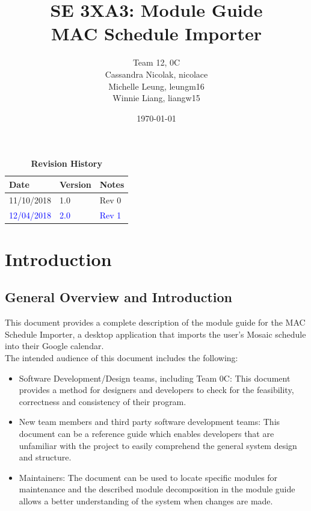 \documentclass[12pt, titlepage]{article}
\title{SE 3XA3: Module Guide\\MAC Schedule Importer}
\author{Team 12, 0C
		\\ Cassandra Nicolak, nicolace
		\\ Michelle Leung, leungm16
		\\ Winnie Liang, liangw15
}
\date{\today}
\begin{document}
\maketitle

\tableofcontents
\listoftables
\listoffigures

\begin{table}[bp]
\caption{\bf Revision History}
\begin{tabularx}{\textwidth}{p{3cm}p{2cm}X}
\toprule {\bf Date} & {\bf Version} & {\bf Notes}\\
\midrule
11/10/2018 & 1.0 & Rev 0\\
\textcolor{blue}{12/04/2018} & \textcolor{blue}{ 2.0} & \textcolor{blue}{Rev 1}\\
\bottomrule
\end{tabularx}
\end{table}

\newpage


\section{Introduction}
\subsection{General Overview and Introduction}
This document provides a complete description of the module guide for the MAC Schedule Importer, a desktop application that imports the user's Mosaic schedule into their Google calendar.\\

The intended audience of this document includes the following: 

\begin{itemize}
\item Software Development/Design teams, including Team 0C: This document provides a method for designers and developers to
  check for the feasibility, correctness and consistency of their program. 
\item New team members and third party software development teams: This document can be a reference guide which enables developers that are unfamiliar with the project to easily comprehend the general system design and structure. 
\item Maintainers: The document can be used to locate specific modules for maintenance and the described module decomposition in the module guide allows a better understanding of the system when changes are made. %
\end{itemize}
\end{document}
